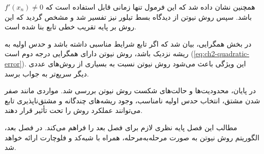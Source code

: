 همچنین نشان داده شد که این فرمول تنها زمانی قابل استفاده است که $f'(x_n)\neq 0$ باشد. سپس روش نیوتن از دیدگاه بسط تیلور نیز تفسیر شد و مشخص گردید که این روش بر پایه تقریب خطی تابع بنا شده است.

در بخش همگرایی، بیان شد که اگر تابع شرایط مناسبی داشته باشد و حدس اولیه به ریشه نزدیک باشد، روش نیوتن دارای همگرایی درجه دوم است (\eqref{eq:ch2-quadratic-error}). این ویژگی باعث می‌شود روش نیوتن نسبت به بسیاری از روش‌های عددی دیگر سریع‌تر به جواب برسد.

در پایان، محدودیت‌ها و حالت‌های شکست روش نیوتن بررسی شد. مواردی مانند صفر شدن مشتق، انتخاب حدس اولیه نامناسب، وجود ریشه‌های چندگانه و مشتق‌ناپذیری تابع می‌توانند عملکرد روش را تحت تأثیر قرار دهند.

مطالب این فصل پایه نظری لازم برای فصل بعد را فراهم می‌کند. در فصل بعد، الگوریتم روش نیوتن به صورت مرحله‌به‌مرحله، همراه با شبه‌کد و فلوچارت ارائه خواهد شد.